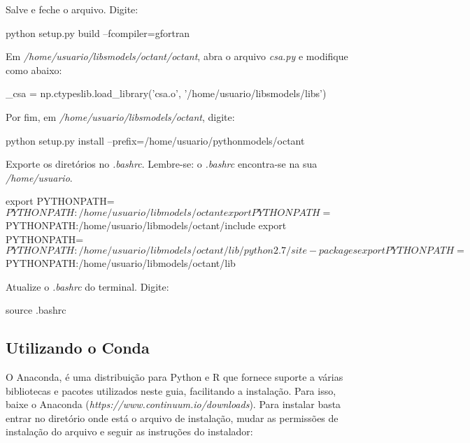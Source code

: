 \noindent Salve e feche o arquivo. Digite:
\bigskip

\begin{bashcode}
python setup.py build --fcompiler=gfortran
\end{bashcode}
\bigskip

\noindent Em \textit{/home/usuario/libsmodels/octant/octant}, abra o arquivo \textit{csa.py} e modifique como abaixo:
\bigskip

\begin{bashcode}
_csa = np.ctypeslib.load_library('csa.o', '/home/usuario/libsmodels/libs')
\end{bashcode}
\bigskip

\noindent Por fim, em \textit{/home/usuario/libsmodels/octant}, digite:
\bigskip

\begin{bashcode}
python setup.py install --prefix=/home/usuario/pythonmodels/octant
\end{bashcode}
\bigskip

\noindent Exporte os diretórios no \textit{.bashrc}. Lembre-se: o \textit{.bashrc} encontra-se na sua \textit{/home/usuario}.
\bigskip

\begin{bashcode}[fontsize=\scriptsize]
export PYTHONPATH=$PYTHONPATH:/home/usuario/libmodels/octant
export PYTHONPATH=$PYTHONPATH:/home/usuario/libmodels/octant/include
export PYTHONPATH=$PYTHONPATH:/home/usuario/libmodels/octant/lib/python2.7/site-packages
export PYTHONPATH=$PYTHONPATH:/home/usuario/libmodels/octant/lib
\end{bashcode}
\bigskip

\noindent Atualize o \textit{.bashrc} do terminal. Digite:
\bigskip

\begin{bashcode}
source .bashrc
\end{bashcode}
\bigskip

\subsection{Utilizando o Conda}\label{condasec}
\bigskip
\noindent O Anaconda, é uma distribuição para Python e R que fornece suporte a várias bibliotecas e pacotes utilizados neste guia, facilitando a instalação. Para isso, baixe o Anaconda (\textcolor{bleu_cite}{\textit{https://www.continuum.io/downloads}}). Para instalar basta entrar no diretório onde está o arquivo de instalação, mudar as permissões de instalação do arquivo e seguir as instruções do instalador:
\bigskip


